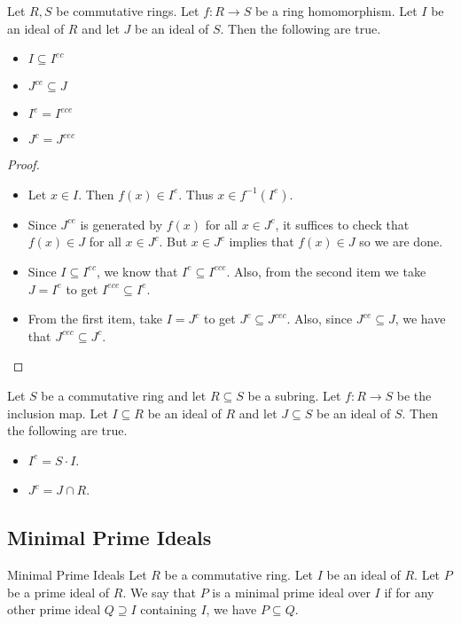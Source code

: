 \documentclass[a4paper]{article}
\begin{document}
\begin{prp}{}{} Let $R,S$ be commutative rings. Let $f:R\to S$ be a ring homomorphism. Let $I$ be an ideal of $R$ and let $J$ be an ideal of $S$. Then the following are true. 
\begin{itemize}
\item $I\subseteq I^{ec}$
\item $J^{ce}\subseteq J$
\item $I^e=I^{ece}$
\item $J^c=J^{cec}$
\end{itemize} 
\begin{proof}~\\
\begin{itemize}
\item Let $x\in I$. Then $f(x)\in I^e$. Thus $x\in f^{-1}(I^e)$. 
\item Since $J^{ce}$ is generated by $f(x)$ for all $x\in J^c$, it suffices to check that $f(x)\in J$ for all $x\in J^c$. But $x\in J^c$ implies that $f(x)\in J$ so we are done. 
\item Since $I\subseteq I^{ec}$, we know that $I^e\subseteq I^{ece}$. Also, from the second item we take $J=I^e$ to get $I^{ece}\subseteq I^e$. 
\item From the first item, take $I=J^c$ to get $J^c\subseteq J^{cec}$. Also, since $J^{ce}\subseteq J$, we have that $J^{cec}\subseteq J^c$. 
\end{itemize}
\end{proof}
\end{prp}

\begin{eg}{}{} Let $S$ be a commutative ring and let $R\subseteq S$ be a subring. Let $f:R\to S$ be the inclusion map. Let $I\subseteq R$ be an ideal of $R$ and let $J\subseteq S$ be an ideal of $S$. Then the following are true. 
\begin{itemize}
\item $I^e=S\cdot I$. 
\item $J^c=J\cap R$. 
\end{itemize}
\end{eg}

\subsection{Minimal Prime Ideals}
\begin{defn}{Minimal Prime Ideals}{} Let $R$ be a commutative ring. Let $I$ be an ideal of $R$. Let $P$ be a prime ideal of $R$. We say that $P$ is a minimal prime ideal over $I$ if for any other prime ideal $Q\supseteq I$ containing $I$, we have $P\subseteq Q$. 
\end{defn}
\end{document}
